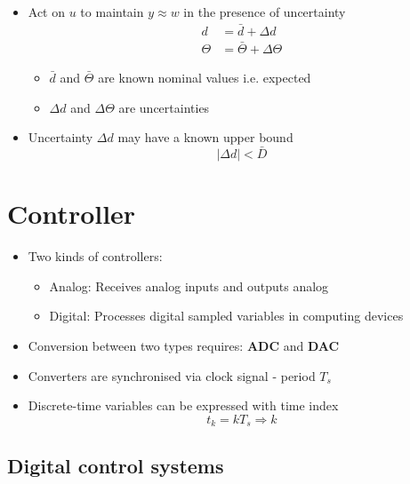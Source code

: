 \documentclass[conference]{IEEEtran}
\begin{document}
\begin{itemize}
    \item Act on $u$ to maintain $y \approx w$ in the presence of uncertainty
    \begin{align*}
        d  &= \bar{d} + \Delta d \\
        \Theta &= \bar{\Theta} + \Delta \Theta
    \end{align*}
    \begin{itemize}
        \item $\bar{d}$ and $\bar{\Theta}$ are known nominal values i.e. expected
        \item $\Delta d$ and $\Delta \Theta$ are uncertainties 
    \end{itemize}

    \item Uncertainty $\Delta d$ may have a known upper bound
    $$
        |\Delta d| < \bar{D}
    $$

\end{itemize}

\section{Controller}
\begin{itemize}
    \item Two kinds of controllers:
    \begin{itemize}
        \item Analog: Receives analog inputs and outputs analog 
        \item Digital: Processes digital sampled variables in computing devices
    \end{itemize}

    \item Conversion between two types requires: \textbf{ADC} and \textbf{DAC}
    \item Converters are synchronised via clock signal - period $T_s$
    \item Discrete-time variables can be expressed with time index
    $$
        t_k = kT_s \Rightarrow k
    $$
\end{itemize}

\subsection{Digital control systems}
\end{document}
